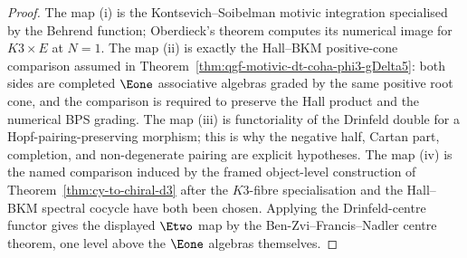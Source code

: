 \begin{proof}
The map \textup{(i)} is the Kontsevich--Soibelman motivic integration
specialised by the Behrend function; Oberdieck's theorem computes its
numerical image for $K3\times E$ at $N=1$. The map \textup{(ii)} is
exactly the Hall--BKM positive-cone comparison assumed in
Theorem~\ref{thm:qgf-motivic-dt-coha-phi3-gDelta5}: both sides are
completed $\Eone$ associative algebras graded by the same positive root
cone, and the comparison is required to preserve the Hall product and
the numerical BPS grading. The map \textup{(iii)} is functoriality of
the Drinfeld double for a Hopf-pairing-preserving morphism; this is why
the negative half, Cartan part, completion, and non-degenerate pairing
are explicit hypotheses. The map \textup{(iv)} is the named
comparison induced by the framed object-level construction of
Theorem~\ref{thm:cy-to-chiral-d3} after the $K3$-fibre
specialisation and the Hall--BKM spectral cocycle have both been
chosen. Applying the Drinfeld-centre functor gives the displayed
$\Etwo$ map by the Ben-Zvi--Francis--Nadler centre theorem, one level
above the $\Eone$ algebras themselves.
\end{proof}


